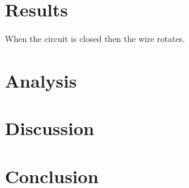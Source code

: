 \documentclass[12pt]{article}
\begin{document}
\section{Results}

When the circuit is closed then the wire rotates.

\section{Analysis}

\section{Discussion}

\section{Conclusion}
\end{document}
